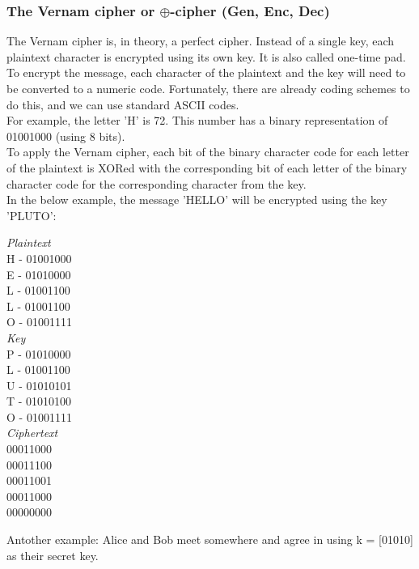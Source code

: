 \documentclass{article}
\begin{document}
\subsubsection{The Vernam cipher or $\oplus$-cipher (Gen, Enc, Dec)}
The Vernam cipher is, in theory, a perfect cipher. Instead of a single key, each plaintext character is encrypted using its own key. It is also called one-time pad.\\
To encrypt the message, each character of the plaintext and the key will need to be converted to a numeric code. Fortunately, there are already coding schemes to do this, and we can use standard ASCII codes.\\
For example, the letter 'H' is 72. This number has a binary representation of 01001000 (using 8 bits).\\ 
To apply the Vernam cipher, each bit of the binary character code for each letter of the plaintext is XORed with the corresponding bit of each letter of the binary character code for the corresponding character from the key.\\
In the below example, the message 'HELLO' will be encrypted using the key 'PLUTO':
\begin{center}
\textit{Plaintext}\\

H - 01001000  \\
E - 01010000  \\
L - 01001100  \\
L - 01001100  \\
O - 01001111 \\ 

\textit{Key}\\

P - 01010000  \\
L - 01001100  \\
U - 01010101  \\
T - 01010100  \\
O - 01001111 \\ 

\textit{Ciphertext}\\

00011000     \\  
00011100    \\   
00011001    \\   
00011000     \\   
00000000
\end{center}

Antother example:
Alice and Bob meet somewhere and agree in using k = [01010] as their secret key.
\end{document}
